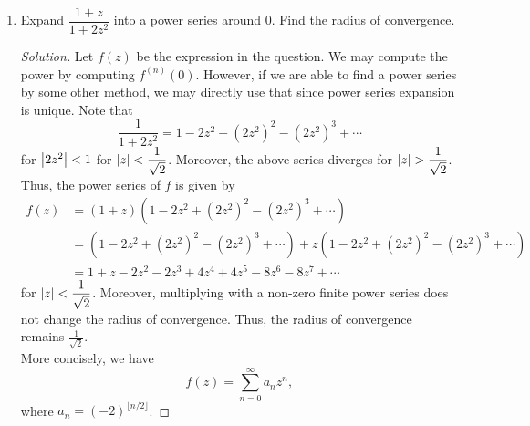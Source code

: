 \documentclass[11pt]{article}
\theoremstyle{definition}
\newenvironment{soln}{\begin{proof}[Solution]}{\end{proof}}
\begin{document}
\begin{enumerate}[leftmargin=*]
\begin{soln}
Note that $f$ is holomorphic and hence continuous. Thus, we have
\begin{align*}
    f(0) &= f \left( \lim_{n \to \infty} \frac{1}{n} \right) \\
    &= \lim_{n \to \infty} f\left( \frac{1}{n} \right) \\
    &= \lim_{n \to \infty} 0 \\
    &= 0.
\end{align*}
Now, we see that $f$ is zero on
\[
    S \vcentcolon= \left\{ 0 \right\} \cup \left\{ \frac{1}{n} \mid n \in \mathbb{N} \right\}.
\]
However, $S$ is not discrete. To see this, note that $0 \in S$, and given any $\delta > 0$, there exists $n \in \mathbb{N}$ such that $1/n < \delta$. Thus, for any $\delta > 0$, $B_{\delta}(0) \cap S$ contains a point other than $0$. Now, we use the Identity Theorem to conclude that $f$ is identically zero, and in particular, constant.
\end{soln}

\item Expand $\dfrac{1+z}{1+2z^2}$ into a power series around $0$. Find the radius of convergence. 

\begin{soln}
Let $f(z)$ be the expression in the question. We may compute the power by computing $f^{(n)}(0)$. However, if we are able to find a power series by some other method, we may directly use that since power series expansion is unique. Note that
\[
    \frac{1}{1+2z^2} = 1 - 2z^2 + (2z^2)^2 - (2z^2)^3 + \cdots
\]
for $\abs{2z^2} < 1$ for $\abs{z} < \dfrac{1}{\sqrt{2}}$. Moreover, the above series diverges for $\abs{z} > \dfrac{1}{\sqrt{2}}$. Thus, the power series of $f$ is given by
\begin{align*}
    f(z) &= (1+z) \left( 1 - 2z^2 + (2z^2)^2 - (2z^2)^3 + \cdots \right) \\
    &= (1 - 2z^2 + (2z^2)^2 - (2z^2)^3 + \cdots) + z(1 - 2z^2 + (2z^2)^2 - (2z^2)^3 + \cdots) \\
    &= 1+z - 2z^2 - 2z^3 + 4z^4 + 4z^5 - 8z^6 - 8z^7  + \cdots
\end{align*}
for $\abs{z} < \dfrac{1}{\sqrt{2}}$. Moreover, multiplying with a non-zero finite power series does not change the radius of convergence. Thus, the radius of convergence remains $\boxed{\frac{1}{\sqrt{2}}}$. \\
More concisely, we have
\[
    f(z) = \sum_{n=0}^{\infty} a_n z^n,
\]
where $a_n = (-2)^{\lfloor n/2 \rfloor}$.
\end{soln}
\end{enumerate}
\end{document}
